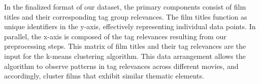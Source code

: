 In the finalized format of our dataset, the primary components consist of film titles and their corresponding tag group relevances. The film titles function as unique identifiers in the y-axis, effectively representing individual data points. In parallel, the x-axis is composed of the tag relevances resulting from our preprocessing steps. This matrix of film titles and their tag relevances are the input for the k-means clustering algorithm. This data arrangement allows the algorithm to observe patterns in tag relevances across different movies, and accordingly, cluster films that exhibit similar thematic elements. 


